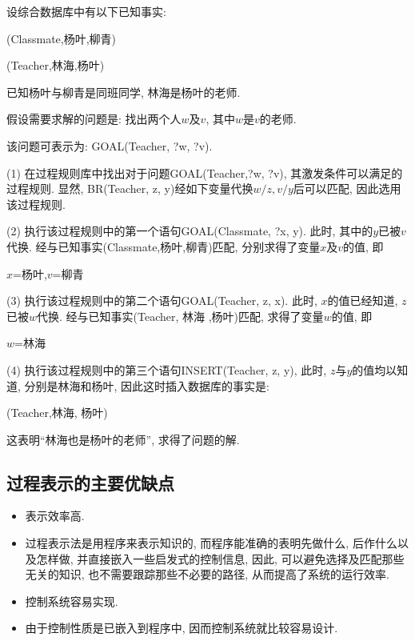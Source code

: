 \begin{example}
设综合数据库中有以下已知事实:
\begin{center}
(Classmate,杨叶,柳青)

(Teacher,林海,杨叶)
\end{center}
已知杨叶与柳青是同班同学, 林海是杨叶的老师.

假设需要求解的问题是: 找出两个人$w$及$v$, 其中$w$是$v$的老师.

该问题可表示为: GOAL(Teacher, ?w, ?v).
\end{example}
\begin{answer}
     (1) 在过程规则库中找出对于问题GOAL(Teacher,?w, ?v), 其激发条件可以满足的过程规则. 显然, BR(Teacher,  z, y)经如下变量代换$w/z,  v/y$后可以匹配, 因此选用该过程规则.

(2) 执行该过程规则中的第一个语句GOAL(Classmate, ?x, y). 此时, 其中的$y$已被$v$代换. 经与已知事实(Classmate,杨叶,柳青)匹配, 分别求得了变量$x$及$v$的值, 即
\begin{center}
  $x$=杨叶,$v$=柳青
\end{center}

(3) 执行该过程规则中的第二个语句GOAL(Teacher, z, x). 此时, $x$的值已经知道, $z$已被$w$代换. 经与已知事实(Teacher, 林海 ,杨叶)匹配, 求得了变量$w$的值, 即
\begin{center}
  $w$=林海
\end{center}

(4) 执行该过程规则中的第三个语句INSERT(Teacher, z, y), 此时, $z$与$y$的值均以知道, 分别是林海和杨叶, 因此这时插入数据库的事实是:
\begin{center}
    (Teacher,林海,   杨叶)
\end{center}
这表明“林海也是杨叶的老师”, 求得了问题的解.
\end{answer}
\subsection{过程表示的主要优缺点}
\begin{itemize}
\item  表示效率高.
\item  过程表示法是用程序来表示知识的, 而程序能准确的表明先做什么, 后作什么以及怎样做, 并直接嵌入一些启发式的控制信息, 因此, 可以避免选择及匹配那些无关的知识, 也不需要跟踪那些不必要的路径, 从而提高了系统的运行效率.
\item  控制系统容易实现.
\item  由于控制性质是已嵌入到程序中, 因而控制系统就比较容易设计.
\end{itemize}

